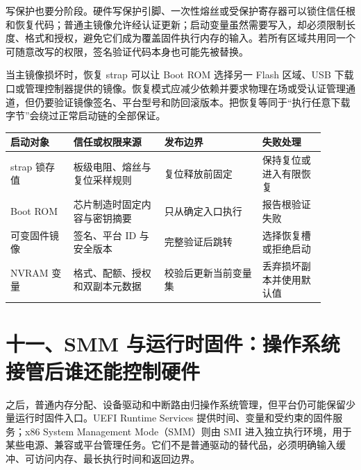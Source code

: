 写保护也要分阶段。硬件写保护引脚、一次性熔丝或受保护寄存器可以锁住信任根和恢复代码；普通主镜像允许经认证更新；启动变量虽然需要写入，却必须限制长度、格式和授权，避免它们成为覆盖固件执行内存的输入。若所有区域共用同一个可随意改写的权限，签名验证代码本身也可能先被替换。


当主镜像损坏时，恢复 strap 可以让 Boot ROM 选择另一 Flash 区域、USB 下载口或管理控制器提供的镜像。恢复模式应减少依赖并要求物理在场或受认证管理通道，但仍要验证镜像签名、平台型号和防回滚版本。把恢复等同于“执行任意下载字节”会绕过正常启动链的全部保证。

\begin{longtable}{L{0.18\linewidth}L{0.26\linewidth}L{0.28\linewidth}L{0.18\linewidth}}
\toprule
启动对象 & 信任或权限来源 & 发布边界 & 失败处理 \\
\midrule
strap 锁存值 & 板级电阻、熔丝与复位采样规则 & 复位释放前固定 & 保持复位或进入有限恢复 \\\tablerowrule
Boot ROM & 芯片制造时固定内容与密钥摘要 & 只从确定入口执行 & 报告根验证失败 \\\tablerowrule
可变固件镜像 & 签名、平台 ID 与安全版本 & 完整验证后跳转 & 选择恢复槽或拒绝启动 \\\tablerowrule
NVRAM 变量 & 格式、配额、授权和双副本元数据 & 校验后更新当前变量集 & 丢弃损坏副本并使用默认值 \\
\bottomrule
\end{longtable}

\section{十一、SMM 与运行时固件：操作系统接管后谁还能控制硬件}

 之后，普通内存分配、设备驱动和中断路由归操作系统管理，但平台仍可能保留少量运行时固件入口。UEFI Runtime Services 提供时间、变量和受约束的固件服务；x86 System Management Mode（SMM）则由 SMI 进入独立执行环境，用于某些电源、兼容或平台管理任务。它们不是普通驱动的替代品，必须明确输入缓冲、可访问内存、最长执行时间和返回边界。

